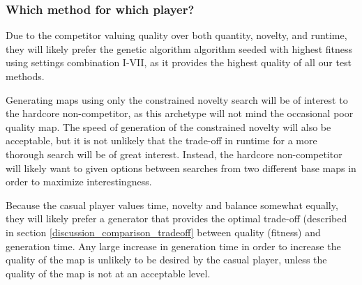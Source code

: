 \subsubsection{Which method for which player?}
Due to the competitor valuing quality over both quantity, novelty, and runtime, they will likely prefer the genetic algorithm algorithm seeded with highest fitness using settings combination I-VII, as it provides the highest quality of all our test methods.

Generating maps using only the constrained novelty search will be of interest to the hardcore non-competitor, as this archetype will not mind the occasional poor quality map. The speed of generation of the constrained novelty will also be acceptable, but it is not unlikely that the trade-off in runtime for a more thorough search will be of great interest. Instead, the hardcore non-competitor will likely want to given options between searches from two different base maps in order to maximize interestingness.

Because the casual player values time, novelty and balance somewhat equally, they will likely prefer a generator that provides the optimal trade-off (described in section \ref{discussion_comparison_tradeoff} between quality (fitness) and generation time. Any large increase in generation time in order to increase the quality of the map is unlikely to be desired by the casual player, unless the quality of the map is not at an acceptable level.